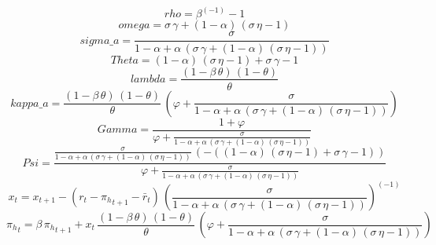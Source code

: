 \begin{dmath*}
rho = {\beta}^{\left(-1\right)}-1
\end{dmath*}
\begin{dmath*}
omega = {\sigma}\, {\gamma}+\left(1-{\alpha}\right)\, \left({\sigma}\, {\eta}-1\right)
\end{dmath*}
\begin{dmath*}
sigma\_a = \frac{{\sigma}}{1-{\alpha}+{\alpha}\, \left({\sigma}\, {\gamma}+\left(1-{\alpha}\right)\, \left({\sigma}\, {\eta}-1\right)\right)}
\end{dmath*}
\begin{dmath*}
Theta = \left(1-{\alpha}\right)\, \left({\sigma}\, {\eta}-1\right)+{\sigma}\, {\gamma}-1
\end{dmath*}
\begin{dmath*}
lambda = \frac{\left(1-{\beta}\, {\theta}\right)\, \left(1-{\theta}\right)}{{\theta}}
\end{dmath*}
\begin{dmath*}
kappa\_a = \frac{\left(1-{\beta}\, {\theta}\right)\, \left(1-{\theta}\right)}{{\theta}}\, \left({\varphi}+\frac{{\sigma}}{1-{\alpha}+{\alpha}\, \left({\sigma}\, {\gamma}+\left(1-{\alpha}\right)\, \left({\sigma}\, {\eta}-1\right)\right)}\right)
\end{dmath*}
\begin{dmath*}
Gamma = \frac{1+{\varphi}}{{\varphi}+\frac{{\sigma}}{1-{\alpha}+{\alpha}\, \left({\sigma}\, {\gamma}+\left(1-{\alpha}\right)\, \left({\sigma}\, {\eta}-1\right)\right)}}
\end{dmath*}
\begin{dmath*}
Psi = \frac{\frac{{\sigma}}{1-{\alpha}+{\alpha}\, \left({\sigma}\, {\gamma}+\left(1-{\alpha}\right)\, \left({\sigma}\, {\eta}-1\right)\right)}\, \left(-\left(\left(1-{\alpha}\right)\, \left({\sigma}\, {\eta}-1\right)+{\sigma}\, {\gamma}-1\right)\right)}{{\varphi}+\frac{{\sigma}}{1-{\alpha}+{\alpha}\, \left({\sigma}\, {\gamma}+\left(1-{\alpha}\right)\, \left({\sigma}\, {\eta}-1\right)\right)}}
\end{dmath*}
\begin{dmath}
{x}_{t}={x}_{t+1}-\left({r}_{t}-{{\pi_h}}_{t+1}-{{\bar r}}_{t}\right)\, \left(\frac{{\sigma}}{1-{\alpha}+{\alpha}\, \left({\sigma}\, {\gamma}+\left(1-{\alpha}\right)\, \left({\sigma}\, {\eta}-1\right)\right)}\right)^{\left(-1\right)}
\end{dmath}
\begin{dmath}
{{\pi_h}}_{t}={\beta}\, {{\pi_h}}_{t+1}+{x}_{t}\, \frac{\left(1-{\beta}\, {\theta}\right)\, \left(1-{\theta}\right)}{{\theta}}\, \left({\varphi}+\frac{{\sigma}}{1-{\alpha}+{\alpha}\, \left({\sigma}\, {\gamma}+\left(1-{\alpha}\right)\, \left({\sigma}\, {\eta}-1\right)\right)}\right)
\end{dmath}
